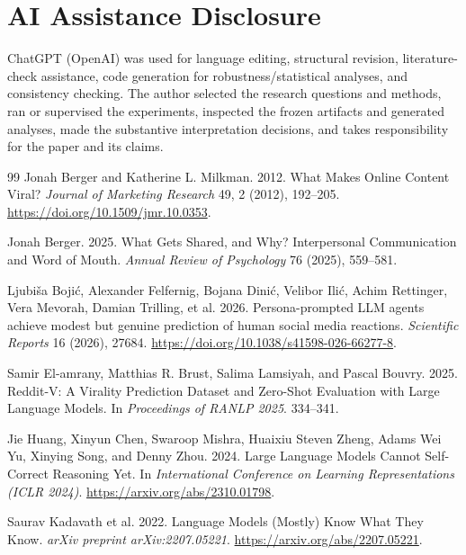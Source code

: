 \documentclass[10pt,twocolumn]{article}
\begin{document}
\section*{AI Assistance Disclosure}
ChatGPT (OpenAI) was used for language editing, structural revision, literature-check assistance, code generation for robustness/statistical analyses, and consistency checking. The author selected the research questions and methods, ran or supervised the experiments, inspected the frozen artifacts and generated analyses, made the substantive interpretation decisions, and takes responsibility for the paper and its claims.

{
\begin{thebibliography}{99}
\scriptsize
\setlength{\itemsep}{0pt}
\setlength{\parskip}{0pt}
Jonah Berger and Katherine L. Milkman. 2012. What Makes Online Content Viral? \emph{Journal of Marketing Research} 49, 2 (2012), 192--205. \url{https://doi.org/10.1509/jmr.10.0353}.

Jonah Berger. 2025. What Gets Shared, and Why? Interpersonal Communication and Word of Mouth. \emph{Annual Review of Psychology} 76 (2025), 559--581.

Ljubi\v{s}a Boji\'c, Alexander Felfernig, Bojana Dini\'c, Velibor Ili\'c, Achim Rettinger, Vera Mevorah, Damian Trilling, et al. 2026. Persona-prompted LLM agents achieve modest but genuine prediction of human social media reactions. \emph{Scientific Reports} 16 (2026), 27684. \url{https://doi.org/10.1038/s41598-026-66277-8}.

Samir El-amrany, Matthias R. Brust, Salima Lamsiyah, and Pascal Bouvry. 2025. Reddit-V: A Virality Prediction Dataset and Zero-Shot Evaluation with Large Language Models. In \emph{Proceedings of RANLP 2025}. 334--341.

Jie Huang, Xinyun Chen, Swaroop Mishra, Huaixiu Steven Zheng, Adams Wei Yu, Xinying Song, and Denny Zhou. 2024. Large Language Models Cannot Self-Correct Reasoning Yet. In \emph{International Conference on Learning Representations (ICLR 2024)}. \url{https://arxiv.org/abs/2310.01798}.

Saurav Kadavath et al. 2022. Language Models (Mostly) Know What They Know. \emph{arXiv preprint arXiv:2207.05221}. \url{https://arxiv.org/abs/2207.05221}.


\end{thebibliography}}
\end{document}
